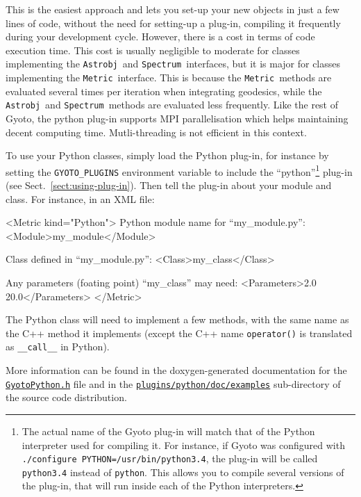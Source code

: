 \documentclass[a4paper,12pt]{article}
\newcommand{\Metric}{\texttt{Metric}}
\newcommand{\Astrobj}{\texttt{Astrobj}}
\newcommand{\Spectrum}{\texttt{Spectrum}}
\begin{document}
This is the easiest approach and lets you set-up your new objects in
just a few lines of code, without the need for setting-up a plug-in,
compiling it frequently during your development cycle. However, there
is a cost in terms of code execution time. This cost is usually
negligible to moderate for classes implementing the \Astrobj\ and
\Spectrum\ interfaces, but it is major for classes implementing the
\Metric\ interface. This is because the \Metric\ methods are evaluated
several times per iteration when integrating geodesics, while the
\Astrobj\ and \Spectrum\ methods are evaluated less frequently. Like
the rest of Gyoto, the python plug-in supports MPI parallelisation
which helps maintaining decent computing time. Mutli-threading is not
efficient in this context.

To use your Python classes, simply load the Python plug-in, for
instance by setting the \texttt{GYOTO\_PLUGINS} environment variable
to include the ``python''\footnote{The actual name of the Gyoto plug-in
  will match that of the Python interpreter used for compiling it. For
  instance, if Gyoto was configured with \texttt{./configure
    PYTHON=/usr/bin/python3.4}, the plug-in will be called
  \texttt{python3.4} instead of \texttt{python}. This allows you to
  compile several versions of the plug-in, that will run inside each
  of the Python interpreters.} plug-in (see
Sect.~\ref{sect:using-plug-in}). Then tell the plug-in about your
module and class. For instance, in an XML file:
\begin{code}
  <Metric kind="Python">
   Python module name for ``my_module.py'':
    <Module>my_module</Module>

   Class defined in ``my_module.py'':
    <Class>my_class</Class>

   Any parameters (foating point) ``my_class'' may need:
    <Parameters>2.0 20.0</Parameters>
  </Metric>
\end{code}

The Python class will need to implement a few methods, with the same
name as the C++ method it implements (except the C++ name
\texttt{operator()} is translated as \texttt{\_\_call\_\_} in Python).

More information can be found in the doxygen-generated documentation
for the
\href{https://github.com/gyoto/Gyoto/blob/master/plugins/python/include/GyotoPython.h}{\texttt{GyotoPython.h}}
file and in the
\href{https://github.com/gyoto/Gyoto/tree/master/plugins/python/doc/examples}{\texttt{plugins/python/doc/examples}}
sub-directory of the source code distribution.
\end{document}
